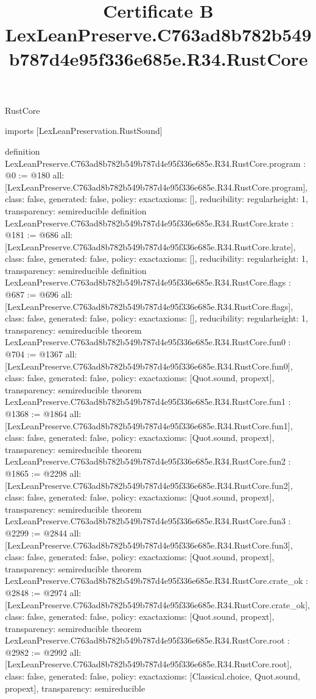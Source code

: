\begin{lexlean}{RustCore}
\title{Certificate B LexLeanPreserve.C763ad8b782b549b787d4e95f336e685e.R34.RustCore}
\begin{coremodule}
imports [LexLeanPreservation.RustSound]

definition LexLeanPreserve.C763ad8b782b549b787d4e95f336e685e.R34.RustCore.program : @0 := @180 {
  all: [LexLeanPreserve.C763ad8b782b549b787d4e95f336e685e.R34.RustCore.program],
  class: false,
  generated: false,
  policy: exact{axioms: []},
  reducibility: regular{height: 1},
  transparency: semireducible
}
definition LexLeanPreserve.C763ad8b782b549b787d4e95f336e685e.R34.RustCore.krate : @181 := @686 {
  all: [LexLeanPreserve.C763ad8b782b549b787d4e95f336e685e.R34.RustCore.krate],
  class: false,
  generated: false,
  policy: exact{axioms: []},
  reducibility: regular{height: 1},
  transparency: semireducible
}
definition LexLeanPreserve.C763ad8b782b549b787d4e95f336e685e.R34.RustCore.flags : @687 := @696 {
  all: [LexLeanPreserve.C763ad8b782b549b787d4e95f336e685e.R34.RustCore.flags],
  class: false,
  generated: false,
  policy: exact{axioms: []},
  reducibility: regular{height: 1},
  transparency: semireducible
}
theorem LexLeanPreserve.C763ad8b782b549b787d4e95f336e685e.R34.RustCore.fun0 : @704 := @1367 {
  all: [LexLeanPreserve.C763ad8b782b549b787d4e95f336e685e.R34.RustCore.fun0],
  class: false,
  generated: false,
  policy: exact{axioms: [Quot.sound, propext]},
  transparency: semireducible
}
theorem LexLeanPreserve.C763ad8b782b549b787d4e95f336e685e.R34.RustCore.fun1 : @1368 := @1864 {
  all: [LexLeanPreserve.C763ad8b782b549b787d4e95f336e685e.R34.RustCore.fun1],
  class: false,
  generated: false,
  policy: exact{axioms: [Quot.sound, propext]},
  transparency: semireducible
}
theorem LexLeanPreserve.C763ad8b782b549b787d4e95f336e685e.R34.RustCore.fun2 : @1865 := @2298 {
  all: [LexLeanPreserve.C763ad8b782b549b787d4e95f336e685e.R34.RustCore.fun2],
  class: false,
  generated: false,
  policy: exact{axioms: [Quot.sound, propext]},
  transparency: semireducible
}
theorem LexLeanPreserve.C763ad8b782b549b787d4e95f336e685e.R34.RustCore.fun3 : @2299 := @2844 {
  all: [LexLeanPreserve.C763ad8b782b549b787d4e95f336e685e.R34.RustCore.fun3],
  class: false,
  generated: false,
  policy: exact{axioms: [Quot.sound, propext]},
  transparency: semireducible
}
theorem LexLeanPreserve.C763ad8b782b549b787d4e95f336e685e.R34.RustCore.crate_ok : @2848 := @2974 {
  all: [LexLeanPreserve.C763ad8b782b549b787d4e95f336e685e.R34.RustCore.crate_ok],
  class: false,
  generated: false,
  policy: exact{axioms: [Quot.sound, propext]},
  transparency: semireducible
}
theorem LexLeanPreserve.C763ad8b782b549b787d4e95f336e685e.R34.RustCore.root : @2982 := @2992 {
  all: [LexLeanPreserve.C763ad8b782b549b787d4e95f336e685e.R34.RustCore.root],
  class: false,
  generated: false,
  policy: exact{axioms: [Classical.choice, Quot.sound, propext]},
  transparency: semireducible
}


\end{coremodule}
\end{lexlean}
